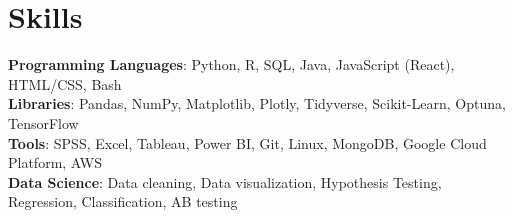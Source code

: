 \section{Skills}
 \begin{itemize}[leftmargin=0.15in, label={}]
    \small{\item{
     \textbf{Programming Languages}{: Python, R, SQL, Java, JavaScript (React), HTML/CSS, Bash} \\
     \textbf{Libraries}{: Pandas, NumPy, Matplotlib, Plotly, Tidyverse, Scikit-Learn, Optuna, TensorFlow}\\
     \textbf{Tools}{: SPSS, Excel, Tableau, Power BI, Git, Linux, MongoDB, Google Cloud Platform, AWS}\\
     \textbf{Data Science}{: Data cleaning, Data visualization, Hypothesis Testing, Regression, Classification, AB testing}\\
    }}
 \end{itemize}